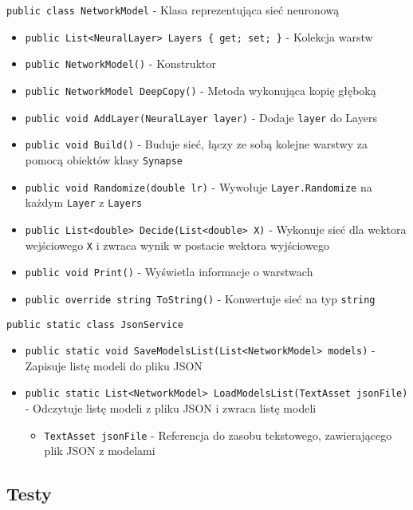 \documentclass[12pt,a4paper]{article}
\begin{document}
\lstinline{public class NetworkModel} - Klasa reprezentująca sieć neuronową
\begin{itemize}
    \item \lstinline|public List<NeuralLayer> Layers { get; set; }| - Kolekcja warstw
    \item \lstinline|public NetworkModel()| - Konstruktor
    \item \lstinline|public NetworkModel DeepCopy()| - Metoda wykonująca kopię głęboką
    \item \lstinline|public void AddLayer(NeuralLayer layer)| - Dodaje \lstinline{layer} do Layers
    \item \lstinline|public void Build()| - Buduje sieć, łączy ze sobą kolejne warstwy za pomocą obiektów klasy \lstinline{Synapse}
    \item \lstinline|public void Randomize(double lr)| - Wywołuje \lstinline{Layer.Randomize} na każdym \lstinline{Layer} z \lstinline{Layers}
    \item \lstinline|public List<double> Decide(List<double> X)| - Wykonuje sieć dla wektora wejściowego \lstinline{X} i zwraca wynik w postacie wektora wyjściowego
    \item \lstinline|public void Print()| - Wyświetla informacje o warstwach
    \item \lstinline|public override string ToString()| - Konwertuje sieć na typ \lstinline{string}
\end{itemize}


\lstinline{public static class JsonService}
\begin{itemize}
    \item \lstinline|public static void SaveModelsList(List<NetworkModel> models)| - Zapisuje listę modeli do pliku JSON
    \item \lstinline|public static List<NetworkModel> LoadModelsList(TextAsset jsonFile)| - Odczytuje listę modeli z pliku JSON i zwraca listę modeli
    \begin{itemize}
        \item \lstinline{TextAsset jsonFile} - Referencja do zasobu tekstowego, zawierającego plik JSON z modelami
    \end{itemize}
\end{itemize}

\subsection*{Testy}
\end{document}
